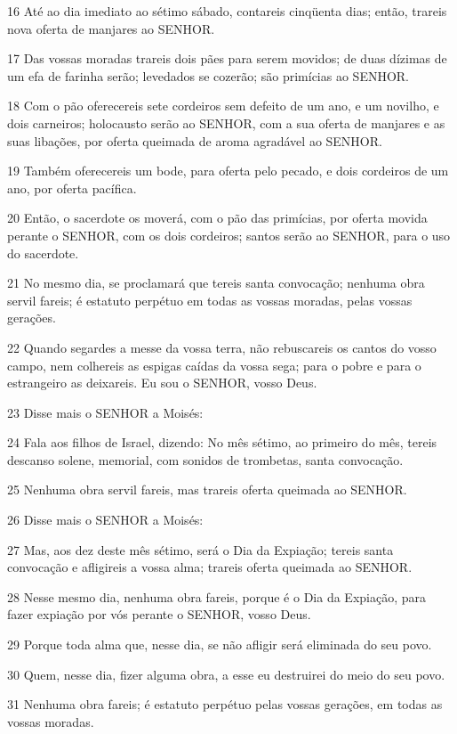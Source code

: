 \par 16 Até ao dia imediato ao sétimo sábado, contareis cinqüenta dias; então, trareis nova oferta de manjares ao SENHOR.
\par 17 Das vossas moradas trareis dois pães para serem movidos; de duas dízimas de um efa de farinha serão; levedados se cozerão; são primícias ao SENHOR.
\par 18 Com o pão oferecereis sete cordeiros sem defeito de um ano, e um novilho, e dois carneiros; holocausto serão ao SENHOR, com a sua oferta de manjares e as suas libações, por oferta queimada de aroma agradável ao SENHOR.
\par 19 Também oferecereis um bode, para oferta pelo pecado, e dois cordeiros de um ano, por oferta pacífica.
\par 20 Então, o sacerdote os moverá, com o pão das primícias, por oferta movida perante o SENHOR, com os dois cordeiros; santos serão ao SENHOR, para o uso do sacerdote.
\par 21 No mesmo dia, se proclamará que tereis santa convocação; nenhuma obra servil fareis; é estatuto perpétuo em todas as vossas moradas, pelas vossas gerações.
\par 22 Quando segardes a messe da vossa terra, não rebuscareis os cantos do vosso campo, nem colhereis as espigas caídas da vossa sega; para o pobre e para o estrangeiro as deixareis. Eu sou o SENHOR, vosso Deus.
\par 23 Disse mais o SENHOR a Moisés:
\par 24 Fala aos filhos de Israel, dizendo: No mês sétimo, ao primeiro do mês, tereis descanso solene, memorial, com sonidos de trombetas, santa convocação.
\par 25 Nenhuma obra servil fareis, mas trareis oferta queimada ao SENHOR.
\par 26 Disse mais o SENHOR a Moisés:
\par 27 Mas, aos dez deste mês sétimo, será o Dia da Expiação; tereis santa convocação e afligireis a vossa alma; trareis oferta queimada ao SENHOR.
\par 28 Nesse mesmo dia, nenhuma obra fareis, porque é o Dia da Expiação, para fazer expiação por vós perante o SENHOR, vosso Deus.
\par 29 Porque toda alma que, nesse dia, se não afligir será eliminada do seu povo.
\par 30 Quem, nesse dia, fizer alguma obra, a esse eu destruirei do meio do seu povo.
\par 31 Nenhuma obra fareis; é estatuto perpétuo pelas vossas gerações, em todas as vossas moradas.
